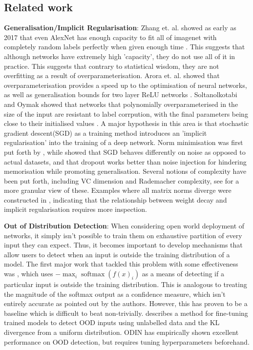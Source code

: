 \documentclass{article}
\DeclareMathOperator{\softmax}{softmax}
\begin{document}
        \subsection{Related work}
            \textbf{Generalisation/Implicit Regularisation}: Zhang et. al. showed as early as 2017 that even AlexNet has enough capacity to fit all of imagenet with completely random labels perfectly when given enough time \cite{zhang2017understandingdeeplearningrequires}. This suggests that although networks have extremely high 'capacity', they do not use all of it in practice. This suggests that contrary to statistical wisdom, they are not overfitting as a result of overparameterisation. Arora et. al. showed that overparameterisation provides a speed up to the optimisation of neural networks, as well as generalisation bounds for two layer ReLU networks \cite{pmlr-v80-arora18a}. Soltanolkotabi and Oymak showed that networks that polynomially overparameterised in the size of the input are resistant to label corrpution, with the final parameters being close to their initialised values \cite{pmlr-v108-li20j}. A major hypothesis in this area is that stochastic gradient descent(SGD) as a training method introduces an 'implicit regularisation' into the training of a deep network. Norm minimisation was first put forth by \cite{neyshabur2015searchrealinductivebias}, while \cite{arpit2017closerlookmemorizationdeep} showed that SGD behaves differently on noise as opposed to actual datasets, and that dropout works better than noise injection for hindering memorisation while promoting generalisation. Several notions of complexity have been put forth, including VC dimension and Rademacher complexity, see \cite{neyshabur2017implicitregularizationdeeplearning} for a more granular view of these. Examples where all matrix norms diverge were constructed in \cite{razin2020implicitregularizationdeeplearning}, indicating that the relationship between weight decay and implicit regularisation requires more inspection.

            \textbf{Out of Distribution Detection}: When considering open world deployment of networks, it simply isn't possible to train them on exhaustive partition of every input they can expect. Thus, it becomes important to develop mechanisms that allow users to detect when an input is outside the training distribution of a model. The first major work that tackled this problem with some effectiveness was \cite{hendrycks2018baselinedetectingmisclassifiedoutofdistribution}, which uses $-\max_i \softmax(f(x)_i)$ as a means of detecting if a particular input is outside the training distribution. This is analogous to treating the magnitude of the softmax output as a confidence measure, which isn't entirely accurate as pointed out by the authors. However, this has proven to be a baseline which is difficult to beat non-trivially. \cite{hendrycks2019deepanomalydetectionoutlier} describes a method for fine-tuning trained models to detect OOD inputs using unlabelled data and the KL divergence from a uniform distribution. ODIN \cite{liang2020enhancingreliabilityoutofdistributionimage} has empirically shown excellent performance on OOD detection, but requires tuning hyperparameters beforehand. 
\end{document}
